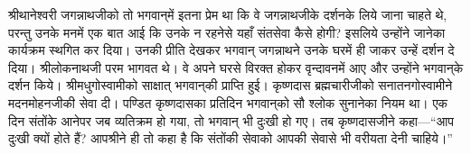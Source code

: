 \begin{sloppypar}\justifying{}
श्रीथानेश्वरी जगन्नाथजीको तो भगवान्‌में इतना प्रेम था कि वे जगन्नाथजीके दर्शनके लिये जाना चाहते थे, परन्तु उनके मनमें एक बात आई कि उनके न रहनेसे यहाँ संत\-सेवा कैसे होगी? इसलिये उन्होंने जानेका कार्यक्रम स्थगित कर दिया। उनकी प्रीति देखकर भगवान् जगन्नाथने उनके घरमें ही जाकर उन्हें दर्शन दे दिया। श्रीलोकनाथजी परम भागवत थे। वे अपने घरसे विरक्त होकर वृन्दावनमें आए और उन्होंने भगवान्‌के दर्शन किये। श्रीमधु\-गोस्वामीको साक्षात् भगवान्‌की प्राप्ति हुई। कृष्णदास ब्रह्मचारीजीको सनातन\-गोस्वामीने मदन\-मोहनजीकी सेवा दी। पण्डित कृष्णदासका प्रतिदिन भगवान्‌को सौ श्लोक सुनानेका नियम था। एक दिन संतोंके आनेपर जब व्यतिक्रम हो गया, तो भगवान् भी दुःखी हो गए। तब कृष्णदासजीने कहा—“आप दुःखी क्यों होते हैं? आपश्रीने ही तो कहा है कि संतोंकी सेवाको आपकी सेवासे भी वरीयता देनी चाहिये।”
\end{sloppypar}


